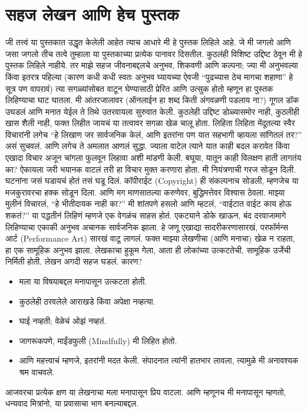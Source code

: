  \chapter{सहज लेखन आणि हेच पुस्तक}
जी तत्त्वं या पुस्तकात उद्धृत केलेली आहेत त्याच आधारे मी हे पुस्तक लिहिले आहे. जे मी जगलो आणि जसा जगलो तीच तत्वे तुम्हाला या पुस्तकाच्या प्रत्येक पानावर दिसतील. 
कुठलंही विशिष्ट उद्दिष्ट ठेवून मी हे पुस्तक लिहिले नाहीये. तर माझे सहज जीवनाबद्दलचे अनुभव, शिकवणी आणि कल्पना; ज्या मी अनुभवल्या किंवा इतरत्र पहिल्या (कारण कधी कधी स्वतः अनुभव घ्यायच्या ऐवजी “पुढच्यास ठेच मागचा शहाणा” हे सूत्र पण वापरावं) त्या सगळ्यांसोबत वाटून घेण्यासाठी प्रेरित आणि उत्सुक होतो म्हणून हा पुस्तक लिहिण्याचा घाट घातला. 
मी आंतरजालावर (ऑनलाईन हा शब्द किती अंगवळणी पडलाय ना?) गूगल डॉक उघडलं आणि मनात येईल ते तिथे उतरवायला सुरुवात केली. कुठलेही उद्दिष्ट डोळ्यासमोर नाही, कुठलीही खास शैली नाही, फक्त लिहीत जायचं या तत्वावर सगळा खेळ चालू होता. लिहिता लिहिता मेंदूतल्या स्वैर विचारांनी लगेच “हे लिखाण जर सार्वजनिक केलं, आणि इतरांना पण यात सहभागी व्हायला सांगितलं तर?” असं सुचवलं. आणि लगेच ते अमलात आणलं सुद्धा. ज्याला वाटेल त्याने यात काही बदल करावेत किंवा एखादा विचार अजून चांगला फुलवून लिहावा अशी मांडणी केली. बघूया, यातून काही विलक्षण हाती लागतंय का?
ऐकायला जरी भयानक वाटलं तरी हा विचार मुक्त करणारा होता. मी नियंत्रणाची गरज सोडून दिली. घटनांना जसं घडायचं होतं तसं घडू दिलं. कॉपीराईट (Copyright) ही संकल्पनाच सोडली, म्हणजेच या मजकुरावरचा हक्क सोडून दिला. आणि मग माणसातल्या करुणेवर, बुद्धिमत्तेवर विश्वास ठेवला.
माझ्या मुलीनं विचारलं, “हे भीतीदायक नाही का?”
मी शांतपणे हसलो आणि म्हटलं, “वाईटात वाईट काय होऊ शकतं?”
या पद्धतीनं लिहिणं म्हणजे एक वेगळंच साहस होतं. एकट्याने डोके खाऊन, बंद दरवाजामागे लिहिण्याचा एकाकी अनुभव अचानक सार्वजनिक झाला. हे जणू एखाद्या सादरीकरणासारखं, परफॉर्मन्स आर्ट (Performance Art) सारखं वाटू लागलं. फक्त माझ्या लेखणीचा (आणि मनाचा) खेळ न राहता, हा एक सामूहिक अनुभव झाला. लेखकाचा हुकूम गेला, आता ही लोकांच्या उत्कटतेची, सामूहिक उर्जेची निर्मिती होती.
लेखन अगदी सहज घडलं. कारण?
 \begin{itemize}
 \item मला या विषयाबद्दल मनापासून उत्कटता होती.
 \item कुठलेही ठरवलेले आराखडे किंवा अपेक्षा नव्हत्या.
 \item घाई नव्हती; वेळेचं ओझं नव्हतं.
 \item जागरूकपणे, माईंडफुली (Mindfully) मी लिहित होतो.
 \item आणि महत्त्वाचं म्हणजे, इतरांनी मदत केली. संपादनात त्यांनी हातभार लावला, त्यामुळे मी अनावश्यक श्रम वाचवले.
 \end{itemize}
आजवरचा प्रत्येक क्षण या लेखनाचा मला मनापासून प्रिय वाटला. आणि म्हणूनच मी मनापासून म्हणतो,  धन्यवाद मित्रांनो, या प्रवासाचा भाग बनल्याबद्दल.

